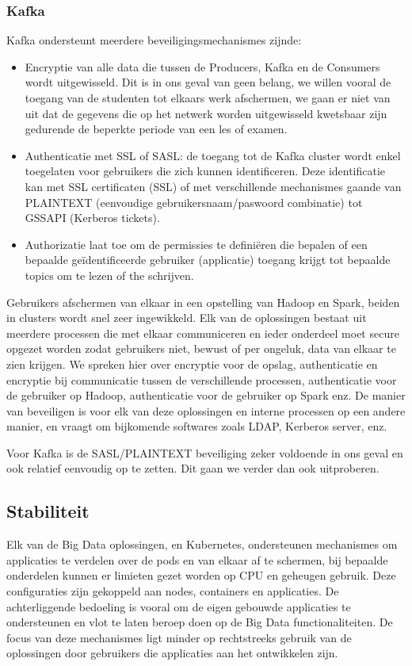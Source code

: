 \subsubsection {Kafka} \autocite{Maarek2018}
Kafka ondersteunt meerdere beveiligingsmechanismes zijnde:
\begin{itemize}
    \item Encryptie van alle data die tussen de Producers, Kafka en de Consumers wordt uitgewisseld. Dit is in ons geval van geen belang, we willen vooral de toegang van de studenten tot elkaars werk afschermen, we gaan er niet van uit dat de gegevens die op het netwerk worden uitgewisseld kwetsbaar zijn gedurende de beperkte periode van een les of examen.
    \item Authenticatie met SSL of SASL: de toegang tot de Kafka cluster wordt enkel toegelaten voor gebruikers die zich kunnen identificeren. Deze identificatie kan met SSL certificaten (SSL)  of met verschillende mechanismes gaande van PLAINTEXT (eenvoudige gebruikersnaam/paswoord combinatie) tot GSSAPI (Kerberos tickets).
    \item Authorizatie laat toe om de permissies te definiëren die bepalen of een bepaalde geïdentificeerde gebruiker (applicatie) toegang krijgt tot bepaalde topics om te lezen of the schrijven.
\end{itemize}

Gebruikers afschermen van elkaar in een opstelling van Hadoop en Spark, beiden in clusters wordt snel zeer ingewikkeld. Elk van de oplossingen bestaat uit meerdere processen die met elkaar communiceren en ieder onderdeel moet secure opgezet worden zodat gebruikers niet, bewust of per ongeluk, data van elkaar te zien krijgen. We spreken hier over encryptie voor de opslag, authenticatie en encryptie bij communicatie tussen de verschillende processen, authenticatie voor de gebruiker op Hadoop, authenticatie voor de gebruiker op Spark enz.
De manier van beveiligen is voor elk van deze oplossingen en interne processen op een andere manier, en vraagt om bijkomende softwares zoals LDAP, Kerberos server, enz.

Voor Kafka is de SASL/PLAINTEXT beveiliging zeker voldoende in ons geval en ook relatief eenvoudig op te zetten. Dit gaan we verder dan ook uitproberen.

\subsection{Stabiliteit}
Elk van de Big Data oplossingen, en Kubernetes, ondersteunen mechanismes om applicaties te verdelen over de pods en van elkaar af te schermen, bij bepaalde onderdelen kunnen er limieten gezet worden op CPU en geheugen gebruik. Deze configuraties zijn gekoppeld aan nodes, containers en applicaties. De achterliggende bedoeling is vooral om de eigen gebouwde applicaties te ondersteunen en vlot te laten beroep doen op de Big Data functionaliteiten. De focus van deze mechanismes ligt minder op rechtstreeks gebruik van de oplossingen door gebruikers die applicaties aan het ontwikkelen zijn.

